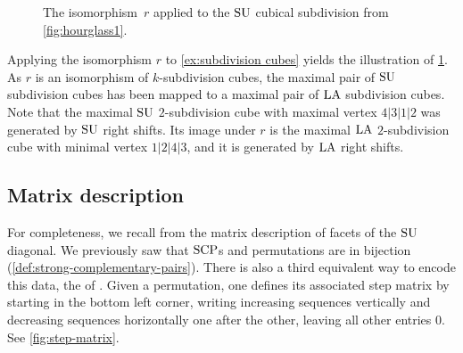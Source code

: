 \begin{figure}[h!]
{{
	}
	}
	\caption{The isomorphism~$r$ applied to the $\mathrm{SU}$ cubical subdivision from \cref{fig:hourglass1}.}
	\label{fig:hourglass2}
\end{figure}

\begin{example}
Applying the isomorphism $r$ to \cref{ex:subdivision cubes} yields the illustration of \cref{fig:hourglass2}.
As $r$ is an isomorphism of $k$-subdivision cubes, the maximal pair of $\mathrm{SU}$ subdivision cubes has been mapped to a maximal pair of $\mathrm{LA}$ subdivision cubes.
Note that the maximal $\mathrm{SU}$ $2$-subdivision cube with maximal vertex $4|3|1|2$ was generated by $\mathrm{SU}$ right shifts.
Its image under $r$ is the maximal $\mathrm{LA}$ $2$-subdivision cube with minimal vertex $1|2|4|3$, and it is generated by $\mathrm{LA}$ right shifts.
\end{example}


\subsection{Matrix description}
\label{subsec:matrix}

For completeness, we recall from \cite{SaneblidzeUmble} the matrix description of facets of the $\mathrm{SU}$ diagonal.
We previously saw that $\mathrm{SCP}$s and permutations are in bijection (\cref{def:strong-complementary-pairs}). 
There is also a third equivalent way to encode this data, the  of \cite[Def. 6]{SaneblidzeUmble}.
Given a permutation, one defines its associated step matrix by starting in the bottom left corner, writing increasing sequences vertically and decreasing sequences horizontally one after the other, leaving all other entries $0$.
See \cref{fig:step-matrix}.

